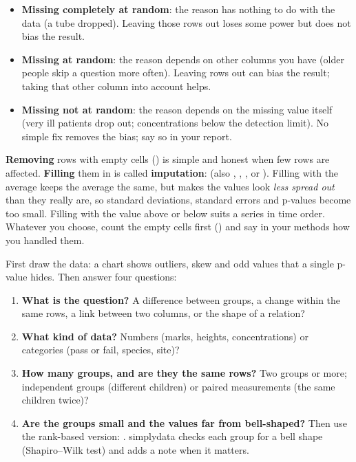 \begin{itemize}
  \item \textbf{Missing completely at random}: the reason has nothing to do with the data (a tube
    dropped). Leaving those rows out loses some power but does not bias the result.
  \item \textbf{Missing at random}: the reason depends on other columns you have (older people skip
    a question more often). Leaving rows out can bias the result; taking that other column into
    account helps.
  \item \textbf{Missing not at random}: the reason depends on the missing value itself (very ill
    patients drop out; concentrations below the detection limit). No simple fix removes the bias;
    say so in your report.
\end{itemize}

\textbf{Removing} rows with empty cells () is
simple and honest when few rows are affected. \textbf{Filling} them in is called
\textbf{imputation}:  (also
, , , or ). Filling with
the average keeps the average the same, but makes the values look \emph{less spread out} than they
really are, so standard deviations, standard errors and p-values become too small. Filling with the
value above or below suits a series in time order. Whatever you choose, count the empty cells first
() and say in your methods how you handled them.


First draw the data: a chart shows outliers, skew and odd values that a single p-value hides. Then
answer four questions:

\begin{enumerate}
  \item \textbf{What is the question?} A difference between groups, a change within the same
    rows, a link between two columns, or the shape of a relation?
  \item \textbf{What kind of data?} Numbers (marks, heights, concentrations) or categories (pass or
    fail, species, site)?
  \item \textbf{How many groups, and are they the same rows?} Two groups or more; independent
    groups (different children) or paired measurements (the same children twice)?
  \item \textbf{Are the groups small and the values far from bell-shaped?} Then use the rank-based
    version: . simplydata checks each group for a bell shape
    (Shapiro--Wilk test) and adds a note when it matters.
\end{enumerate}

